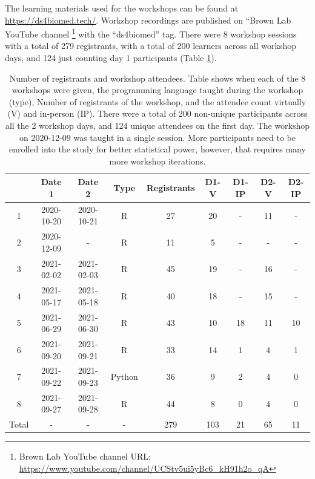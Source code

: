 \documentclass[030-workshop.tex]{subfiles}
\begin{document}
    The learning materials used for the workshops can be found at
    \url{https://ds4biomed.tech/}.
    Workshop recordings are published on ``Brown Lab YouTube channel
    \footnote{Brown Lab YouTube channel URL: \url{https://www.youtube.com/channel/UCStv5ui5yBc6_kH91h2o_qA}}
    with the ``ds4biomed'' tag.
    There were 8 workshop sessions with a total of 279 registrants,
    with a total of 200 learners across all workshop days,
    and 124 just counting day 1 participants
    (Table \ref{tab:workshop-counts}).

    \begin{table}[!hbtp]
        \centering
        \caption[Workshop Registration and Attendance Counts]
            {Number of registrants and workshop attendees.
            Table shows when each of the 8 workshops were given, the programming language taught during the workshop (type),
            Number of registrants of the workshop, and the attendee count virtually (V) and in-person (IP).
            There were a total of 200 non-unique participants across all the 2 workshop days,
            and 124 unique attendees on the first day.
            The workshop on 2020-12-09 was taught in a single session.
            More participants need to be enrolled into the study for better statistical power,
            however, that requires many more workshop iterations.
            }
        \begin{tabularx}{\textwidth}{ccccccccc}
            \toprule
              & Date 1 & Date 2 & Type & Registrants & D1-V & D1-IP & D2-V & D2-IP \\
            \midrule
            1 & 2020-10-20 & 2020-10-21 & R &  27 & 20 & - & 11 & - \\
            2 & 2020-12-09 & - & R &  11 & 5 & - & - & - \\
            3 & 2021-02-02 & 2021-02-03 & R &  45 & 19 & - & 16 & - \\
            4 & 2021-05-17 & 2021-05-18 & R &  40 & 18 & - & 15 & - \\
            5 & 2021-06-29 & 2021-06-30 & R &  43 & 10 & 18 & 11 & 10 \\
            6 & 2021-09-20 & 2021-09-21 & R &  33 & 14 & 1 & 4 & 1 \\
            7 & 2021-09-22 & 2021-09-23 & Python &  36 & 9 & 2 & 4 & 0 \\
            8 & 2021-09-27 & 2021-09-28 & R &  44 & 8 & 0 & 4 & 0 \\
            Total & - & - & - & 279 & 103 & 21 & 65 & 11 \\
            \bottomrule
            \end{tabularx}
        \label{tab:workshop-counts}
    \end{table}
\end{document}
